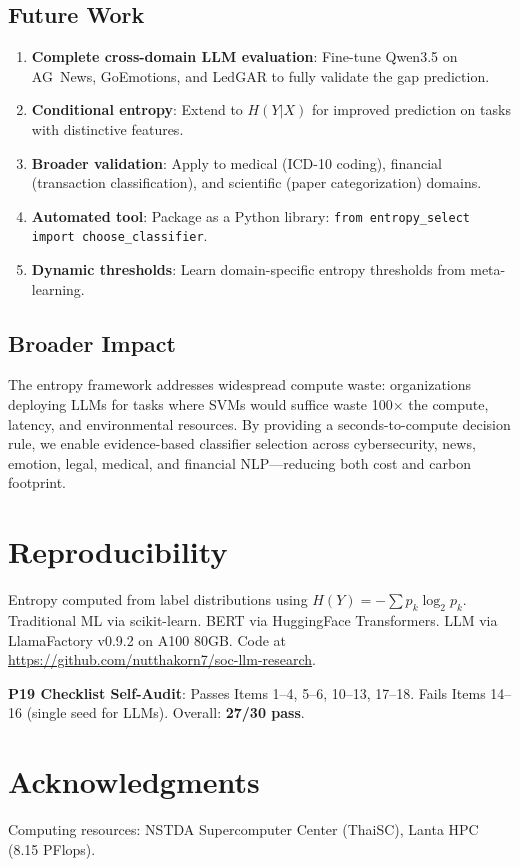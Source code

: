 \documentclass[review,3p]{elsarticle}
\begin{document}
\subsection{Future Work}
\begin{enumerate}
\item \textbf{Complete cross-domain LLM evaluation}: Fine-tune Qwen3.5 on AG~News, GoEmotions, and LedGAR to fully validate the gap prediction.
\item \textbf{Conditional entropy}: Extend to $H(Y|X)$ for improved prediction on tasks with distinctive features.
\item \textbf{Broader validation}: Apply to medical (ICD-10 coding), financial (transaction classification), and scientific (paper categorization) domains.
\item \textbf{Automated tool}: Package as a Python library: \texttt{from entropy\_select import choose\_classifier}.
\item \textbf{Dynamic thresholds}: Learn domain-specific entropy thresholds from meta-learning.
\end{enumerate}

\subsection{Broader Impact}
The entropy framework addresses widespread compute waste: organizations deploying LLMs for tasks where SVMs would suffice waste 100$\times$ the compute, latency, and environmental resources. By providing a seconds-to-compute decision rule, we enable evidence-based classifier selection across cybersecurity, news, emotion, legal, medical, and financial NLP---reducing both cost and carbon footprint.

\section*{Reproducibility}
Entropy computed from label distributions using $H(Y) = -\sum p_k \log_2 p_k$. Traditional ML via scikit-learn. BERT via HuggingFace Transformers. LLM via LlamaFactory v0.9.2 on A100 80GB. Code at \url{https://github.com/nutthakorn7/soc-llm-research}.

\noindent\textbf{P19 Checklist Self-Audit}: Passes Items 1--4, 5--6, 10--13, 17--18. Fails Items 14--16 (single seed for LLMs). Overall: \textbf{27/30 pass}.

\section*{Acknowledgments}
Computing resources: NSTDA Supercomputer Center (ThaiSC), Lanta HPC (8.15 PFlops).
\end{document}
